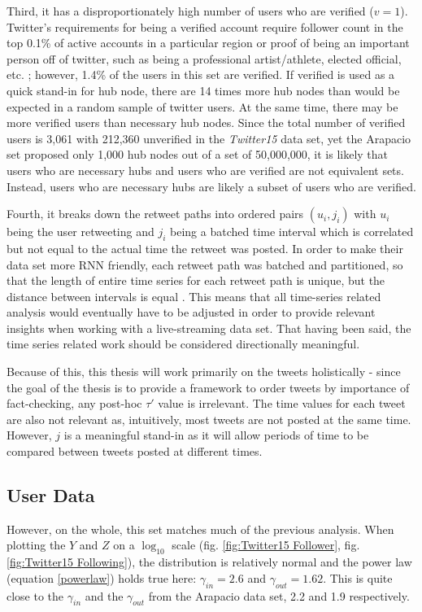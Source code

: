 \documentclass[preprint,review,12pt]{elsarticle}
\begin{document}
Third, it has a disproportionately high number of users who are verified ($v = 1$). Twitter's requirements for being a verified account require follower count in the top 0.1\% of active accounts in a particular region or proof of being an important person off of twitter, such as being a professional artist/athlete, elected official, etc. \citep{twitter2020verified}; however, 1.4\% of the users in this set are verified. If verified is used as a quick stand-in for hub node, there are 14 times more hub nodes than would be expected in a random sample of twitter users. At the same time, there may be more verified users than necessary hub nodes. Since the total number of verified users is 3,061 with 212,360 unverified in the \textit{Twitter15} data set, yet the Arapacio set proposed only 1,000 hub nodes out of a set of 50,000,000, it is likely that users who are necessary hubs and users who are verified are not equivalent sets. Instead, users who are necessary hubs are likely a subset of users who are verified. 

Fourth, it breaks down the retweet paths into ordered pairs $(u_i,j_i)$ with $u_i$ being the user retweeting and $j_i$ being a batched time interval which is correlated but not equal to the actual time the retweet was posted. In order to make their data set more RNN friendly, each retweet path was batched and partitioned, so that the length of entire time series for each retweet path is unique, but the distance between intervals is equal \citep{shu2017fake}. This means that all time-series related analysis would eventually have to be adjusted in order to provide relevant insights when working with a live-streaming data set. That having been said, the time series related work should be considered directionally meaningful.

Because of this, this thesis will work primarily on the tweets holistically - since the goal of the thesis is to provide a framework to order tweets by importance of fact-checking, any post-hoc $\tau'$ value is irrelevant. The time values for each tweet are also not relevant as, intuitively, most tweets are not posted at the same time. However, $j$ is a meaningful stand-in as it will allow periods of time to be compared between tweets posted at different times. 

 \subsection{User Data}
However, on the whole, this set matches much of the previous analysis. When plotting the $Y$ and $Z$ on a $\log_{10}$ scale (fig. \ref{fig:Twitter15 Follower}, fig. \ref{fig:Twitter15 Following}), the distribution is relatively normal and the power law (equation \ref{powerlaw}) holds true here:  $\gamma_{in} = 2.6$ and $\gamma_{out} = 1.62$. This is quite close to the $\gamma_{in}$ and the $\gamma_{out}$  from the Arapacio data set, 2.2 and 1.9 respectively.
 
\end{document}
